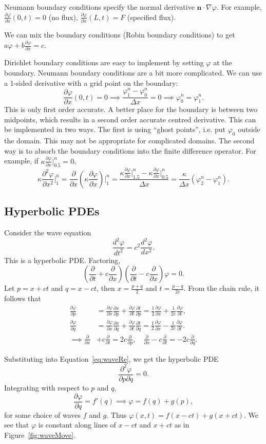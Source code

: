 \documentclass[11pt, a4paper]{article}
\renewcommand{\phi}{\varphi}
\theoremstyle{break}
\newcommand*{\Paren}[1]{\left(#1\right)}%
\newcommand{\ve}{\mathbf} %
\newcommand{\dx}{\Delta x}
\newcommand{\der}[2]{\frac{\partial #1}{\partial #2}}
\newcommand{\pder}[3][2]{\frac{\partial^#1 #2}{\partial #3^#1}}
\newcommand{\ddder}[3][2]{\frac{d^#1 #2}{d #3^#1}}
\newcommand{\eval}[1]{\big\rvert_{#1}}
\newcommand{\Eval}[1]{\bigg\rvert_{#1}}
\begin{document}
Neumann boundary conditions specify the normal derivative $\ve n\cdot\nabla\phi$. For example, $\der\phi x(0,t)=0$ (no flux), $\der\phi x(L,t)=F$ (specified flux).

We can mix the boundary conditions (Robin boundary conditions) to get $a\phi+b\der\phi x=c$.

Dirichlet boundary conditions are easy to implement by setting $\phi$ at the boundary. Neumann boundary conditions are a bit more complicated. We can use a 1-sided derivative with a grid point on the boundary: \[\der\phi x(0,t)=0\implies \frac{\phi_1^n-\phi_0^n}{\dx}=0\implies \phi_0^n=\phi_1^n.\] This is only first order accurate. A better place for the boundary is between two midpoints, which results in a second order accurate centred derivative. This can be implemented in two ways. The first is using ``ghost points'', i.e. put $\phi_0$ outside the domain. This may not be appropriate for complicated domains. The second way is to absorb the boundary conditions into the finite difference operator. For example, if $\kappa \der\phi x\eval{0.5}^n=0$, \[\kappa \pder\phi x\Eval1^n=\der{}x\Paren{\kappa\der\phi x}\Eval 1^n=\frac{\kappa\der\phi x\eval{1.5}^n-\kappa \der\phi x\eval{0.5}^n}{\dx}=\frac{\kappa}{\dx}(\phi_2^n-\phi_1^n).\]


\subsection{Hyperbolic PDEs}
Consider the wave equation \[\ddder\phi t = c^2 \ddder\phi x.  \] This is a hyperbolic PDE. Factoring, \begin{equation}\label{eq:waveRe}\Paren{\der{}t + c\der{}x}\Paren{\der{}{t}-c\der{}x}\phi = 0.\end{equation} Let $p=x+ct$ and $q=x-ct$, then $x=\frac{p+q}2$ and $t=\frac{p-q}{2c}$. From the chain rule, it follows that \begin{align*}\der\phi p&=\der\phi x\der xp+\der\phi t\der tp=\frac12\der\phi x+\frac1{2c}\der\phi t,\\\der\phi q&=\der\phi x\der xq+\der\phi t\der tq=\frac12\der\phi x -\frac{1}{2c}\der \phi t.\\
\implies \der{}x&+c\der{}t = 2c\der{}p,\quad \der{}x-c\der{}t=-2c\der{}q.
\end{align*}

Substituting into Equation~\ref{eq:waveRe}, we get the hyperbolic PDE \[\der{^2\phi}{p\partial q}=0.\]
Integrating with respect to $p$ and $q$, \[\der\phi q=f'(q) \implies \phi = f(q)+g(p),\] for some choice of waves $f$ and $g$. Thus $\phi(x, t)=f(x-ct)+g(x+ct)$. We see that $\phi$ is constant along lines of $x-ct$ and $x+ct$ as in Figure~\ref{fig:waveMove}.
\end{document}
